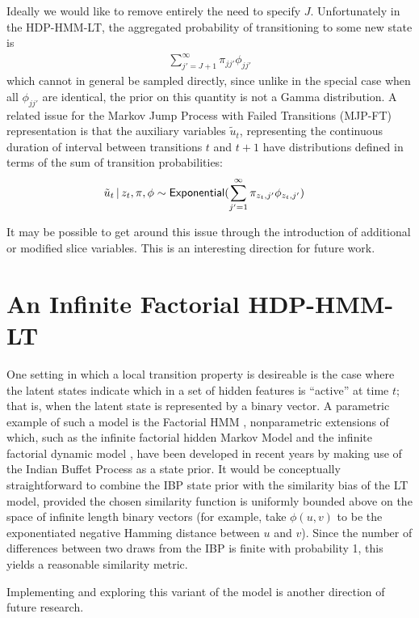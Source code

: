 Ideally we would like to remove entirely the need to specify $J$.  Unfortunately in the HDP-HMM-LT, the aggregated probability of transitioning to some new state is
\begin{align}
  \sum_{j'=J+1}^{\infty} \pi_{jj'}\phi_{jj'}
\end{align}
which cannot in general be sampled directly, since unlike in the special case when all $\phi_{jj'}$ are identical, the prior on this quantity is not a Gamma distribution.  A related issue for the Markov Jump Process with Failed Transitions (MJP-FT) representation is that the auxiliary variables $\tilde{u}_t$, representing the continuous duration of interval between transitions $t$ and $t+1$ have distributions defined in terms of the sum of transition probabilities:
\begin{align}
  \tilde{u}_t \, \vert \, z_t, \pi, \phi &\sim \mathsf{Exponential}(\sum_{j'=1}^\infty \pi_{z_t,j'}\phi_{z_t,j'})
\end{align}

It may be possible to get around this issue through the introduction of additional or modified slice variables.  This is an interesting direction for future work.

\section{An Infinite Factorial HDP-HMM-LT}
\label{sec:an-infin-fact}

One setting in which a local transition property is
desireable is the case where the latent states indicate which in a set
of hidden features is ``active'' at time $t$; that is, when the latent
state is represented by a binary vector.  A parametric example of such
a model is the Factorial HMM \cite{ghahramani1997factorial},
nonparametric extensions of which, such as the infinite factorial
hidden Markov Model \cite{gael2009infinite} and the infinite factorial dynamic model
\cite{valera2015infinite}, have been developed in recent years
by making use of the Indian Buffet Process
\cite{ghahramani2005infinite} as a state prior.  It would be
conceptually straightforward to combine the IBP state prior with the
similarity bias of the LT model, provided the chosen similarity
function is uniformly bounded above on the space of infinite length
binary vectors (for example, take $\phi(u,v)$ to be the exponentiated
negative Hamming distance between $u$ and $v$).  Since the number of
differences between two draws from the IBP is finite with probability
1, this yields a reasonable similarity metric.

Implementing and exploring this variant of the model is another direction of future research.
